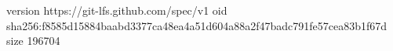 version https://git-lfs.github.com/spec/v1
oid sha256:f8585d15884baabd3377ca48ea4a51d604a88a2f47badc791fe57cea83b1f67d
size 196704
